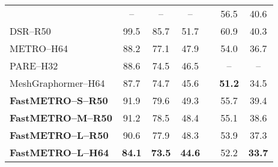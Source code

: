 \begin{table}[t!]
{\begin{tabular}{lcccccc}
            & --
            & -- 
            & -- 
            & 
            & 56.5 
            & 40.6
        \\
            DSR--R50~\cite{dwivedi2021dsr}
            & 99.5
            & 85.7 
            & 51.7 
            & 
            & 60.9
            & 40.3
        \\
            METRO--H64~\cite{lin2021metro}
            & 88.2 
            & 77.1 
            & 47.9 
            & 
            & 54.0 
            & 36.7
        \\
            PARE--H32~\cite{Kocabas_PARE_2021}
            & 88.6
            & 74.5 
            & 46.5 
            & 
            & --
            & --
        \\
            MeshGraphormer--H64~\cite{lin2021graphormer}
            & 87.7 
            & 74.7 
            & 45.6 
            & 
            & \textbf{51.2} 
            & 34.5
        \\
        \hhline{-|-|-|-|-|-|-|}
            \cellcolor{gray!7.5}\textbf{FastMETRO--S--R50}
            & \cellcolor{gray!7.5}91.9 
            & \cellcolor{gray!7.5}79.6 
            & \cellcolor{gray!7.5}49.3 
            & \cellcolor{gray!7.5}
            & \cellcolor{gray!7.5}55.7 
            & \cellcolor{gray!7.5}39.4
        \\
            \cellcolor{gray!7.5}\textbf{FastMETRO--M--R50}
            & \cellcolor{gray!7.5}91.2 
            & \cellcolor{gray!7.5}78.5 
            & \cellcolor{gray!7.5}48.4 
            & \cellcolor{gray!7.5}
            & \cellcolor{gray!7.5}55.1 
            & \cellcolor{gray!7.5}38.6
        \\
            \cellcolor{gray!7.5}\textbf{FastMETRO--L--R50}
            & \cellcolor{gray!7.5}90.6 
            & \cellcolor{gray!7.5}77.9 
            & \cellcolor{gray!7.5}48.3 
            & \cellcolor{gray!7.5}
            & \cellcolor{gray!7.5}53.9 
            & \cellcolor{gray!7.5}37.3
        \\
            \cellcolor{gray!7.5}\textbf{FastMETRO--L--H64}
            & \cellcolor{gray!7.5}\textbf{84.1} 
            & \cellcolor{gray!7.5}\textbf{73.5} 
            & \cellcolor{gray!7.5}\textbf{44.6} 
            & \cellcolor{gray!7.5}
            & \cellcolor{gray!7.5}52.2 
            & \cellcolor{gray!7.5}\textbf{33.7}
        \\
        \hline
    \end{tabular}}
    \label{table:previous}
\end{table}

